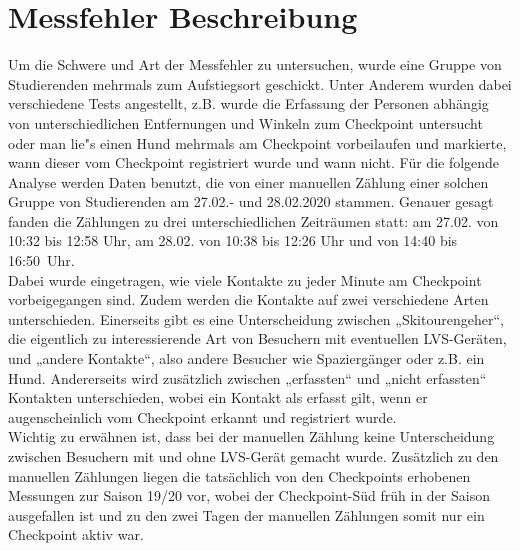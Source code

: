 \documentclass[12pt]{scrreprt}
\begin{document}
\section{Messfehler Beschreibung}
Um die Schwere und Art der Messfehler zu untersuchen, wurde eine Gruppe von Studierenden mehrmals zum Aufstiegsort geschickt. Unter Anderem wurden dabei verschiedene Tests angestellt, z.B. wurde die Erfassung der Personen abhängig von unterschiedlichen Entfernungen und Winkeln zum Checkpoint untersucht oder man lie"s einen Hund mehrmals am Checkpoint vorbeilaufen und markierte, wann dieser vom Checkpoint registriert wurde und wann nicht. Für die folgende Analyse werden Daten benutzt, die von einer manuellen Zählung einer solchen Gruppe von Studierenden am 27.02.- und 28.02.2020 stammen. Genauer gesagt fanden die Zählungen zu drei unterschiedlichen Zeiträumen statt: am 27.02. von 10:32 bis 12:58 Uhr, am 28.02. von 10:38 bis 12:26 Uhr und von 14:40 bis 16:50~Uhr.\\
Dabei wurde eingetragen, wie viele Kontakte zu jeder Minute am Checkpoint vorbeigegangen sind. Zudem werden die Kontakte auf zwei verschiedene Arten unterschieden. Einerseits gibt es eine Unterscheidung zwischen „Skitourengeher“, die eigentlich zu interessierende Art von Besuchern mit eventuellen LVS-Geräten, und „andere Kontakte“, also andere Besucher wie Spaziergänger oder z.B. ein Hund. Andererseits wird zusätzlich zwischen „erfassten“ und „nicht erfassten“ Kontakten unterschieden, wobei ein Kontakt als erfasst gilt, wenn er augenscheinlich vom Checkpoint erkannt und registriert wurde.\\
Wichtig zu erwähnen ist, dass bei der manuellen Zählung keine Unterscheidung zwischen Besuchern mit und ohne LVS-Gerät gemacht wurde. Zusätzlich zu den manuellen Zählungen liegen die tatsächlich von den Checkpoints erhobenen Messungen zur Saison 19/20 vor, wobei der Checkpoint-Süd früh in der Saison ausgefallen ist und zu den zwei Tagen der manuellen Zählungen somit nur ein Checkpoint aktiv war.
\end{document}
